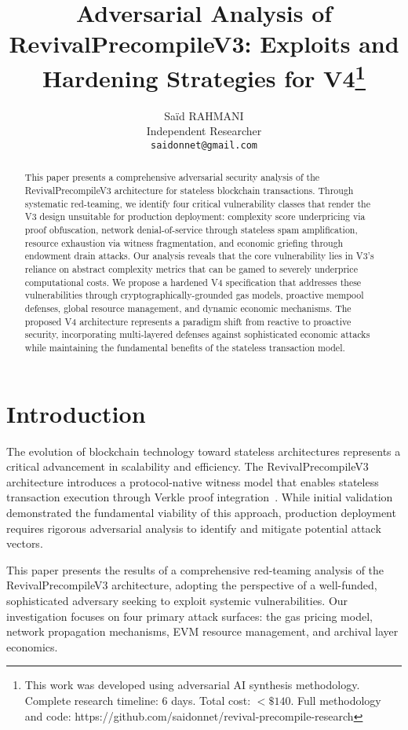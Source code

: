 \documentclass{article}
\title{Adversarial Analysis of RevivalPrecompileV3: Exploits and Hardening Strategies for V4\thanks{This work was developed using adversarial AI synthesis methodology. Complete research timeline: 6 days. Total cost: $<\$140$. Full methodology and code: https://github.com/saidonnet/revival-precompile-research}}
\author{
  Saïd RAHMANI \\
  Independent Researcher \\
  \texttt{saidonnet@gmail.com}
}
\date{}
\begin{document}
\maketitle

\begin{abstract}
This paper presents a comprehensive adversarial security analysis of the RevivalPrecompileV3 architecture for stateless blockchain transactions. Through systematic red-teaming, we identify four critical vulnerability classes that render the V3 design unsuitable for production deployment: complexity score underpricing via proof obfuscation, network denial-of-service through stateless spam amplification, resource exhaustion via witness fragmentation, and economic griefing through endowment drain attacks. Our analysis reveals that the core vulnerability lies in V3's reliance on abstract complexity metrics that can be gamed to severely underprice computational costs. We propose a hardened V4 specification that addresses these vulnerabilities through cryptographically-grounded gas models, proactive mempool defenses, global resource management, and dynamic economic mechanisms. The proposed V4 architecture represents a paradigm shift from reactive to proactive security, incorporating multi-layered defenses against sophisticated economic attacks while maintaining the fundamental benefits of the stateless transaction model.
\end{abstract}

\section{Introduction}

The evolution of blockchain technology toward stateless architectures represents a critical advancement in scalability and efficiency. The RevivalPrecompileV3 architecture introduces a protocol-native witness model that enables stateless transaction execution through Verkle proof integration~\cite{ethereum2023verkle}. While initial validation demonstrated the fundamental viability of this approach, production deployment requires rigorous adversarial analysis to identify and mitigate potential attack vectors.

This paper presents the results of a comprehensive red-teaming analysis of the RevivalPrecompileV3 architecture, adopting the perspective of a well-funded, sophisticated adversary seeking to exploit systemic vulnerabilities. Our investigation focuses on four primary attack surfaces: the gas pricing model, network propagation mechanisms, EVM resource management, and archival layer economics.
\end{document}
